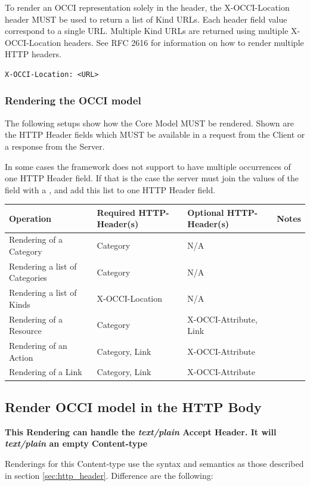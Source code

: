 \documentclass[10pt,a4paper]{article}
\begin{document}
To render an OCCI representation solely in the header, the X-OCCI-Location header MUST be used to return a list of Kind URLs. Each header field value correspond to a single URL. Multiple Kind URLs are returned using multiple X-OCCI-Location headers. See RFC 2616 for information on how to render multiple HTTP headers.

\begin{verbatim}
X-OCCI-Location: <URL>
\end{verbatim}

\subsubsection{Rendering the OCCI model}

The following setups show how the Core Model MUST be rendered. Shown are the HTTP Header fields which MUST be available in a request from the Client or a response from the Server.

In some cases the framework does not support to have multiple occurrences of one HTTP Header field. If that is the case the server must join the values of the field with a \emph{,} and add this list to one HTTP Header field.

\begin{tabular}{l|l|l|l}
Operation & Required HTTP-Header(s) & Optional HTTP-Header(s) & Notes \\
\hline
Rendering of a Category & Category & N/A & \\
Rendering a list of Categories & Category & N/A & \\
Rendering a list of Kinds & X-OCCI-Location & N/A & \\
Rendering of a Resource & Category & X-OCCI-Attribute, Link & \\
Rendering of an Action & Category, Link & X-OCCI-Attribute & \\
Rendering of a Link & Category, Link & X-OCCI-Attribute & \\
\end{tabular}

\subsection{Render OCCI model in the HTTP Body}
\label{sec:http_body}

\textbf{This Rendering can handle the \textit{text/plain} Accept Header. It will \textit{text/plain} an empty Content-type}

Renderings for this Content-type use the syntax and semantics as those described in section \ref{sec:http_header}. Difference are the following:
\end{document}

